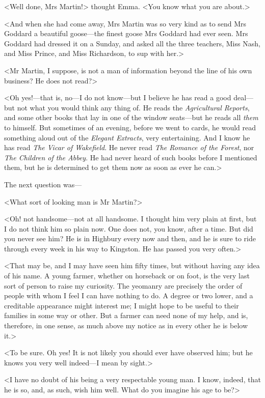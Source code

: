 <Well done, Mrs Martin!> thought Emma. <You know what you are about.>

<And when she had come away, Mrs Martin was so very kind as to send Mrs Goddard a beautiful goose—the finest goose Mrs Goddard had ever seen. Mrs Goddard had dressed it on a Sunday, and asked all the three teachers, Miss Nash, and Miss Prince, and Miss Richardson, to sup with her.>

<Mr Martin, I suppose, is not a man of information beyond the line of his own business? He does not read?>

<Oh yes!—that is, no—I do not know—but I believe he has read a good deal—but not what you would think any thing of. He reads the \textit{Agricultural Reports}, and some other books that lay in one of the window seats—but he reads all \textit{them} to himself. But sometimes of an evening, before we went to cards, he would read something aloud out of the \textit{Elegant Extracts}, very entertaining. And I know he has read \textit{The Vicar of Wakefield}. He never read \textit{The Romance of the Forest}, nor \textit{The Children of the Abbey}. He had never heard of such books before I mentioned them, but he is determined to get them now as soon as ever he can.>

The next question was—

<What sort of looking man is Mr Martin?>

<Oh! not handsome—not at all handsome. I thought him very plain at first, but I do not think him so plain now. One does not, you know, after a time. But did you never see him? He is in Highbury every now and then, and he is sure to ride through every week in his way to Kingston. He has passed you very often.>

<That may be, and I may have seen him fifty times, but without having any idea of his name. A young farmer, whether on horseback or on foot, is the very last sort of person to raise my curiosity. The yeomanry are precisely the order of people with whom I feel I can have nothing to do. A degree or two lower, and a creditable appearance might interest me; I might hope to be useful to their families in some way or other. But a farmer can need none of my help, and is, therefore, in one sense, as much above my notice as in every other he is below it.>

<To be sure. Oh yes! It is not likely you should ever have observed him; but he knows you very well indeed—I mean by sight.>

<I have no doubt of his being a very respectable young man. I know, indeed, that he is so, and, as such, wish him well. What do you imagine his age to be?>

